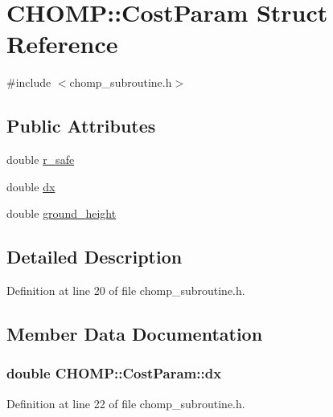 \hypertarget{struct_c_h_o_m_p_1_1_cost_param}{}\section{C\+H\+O\+MP\+:\+:Cost\+Param Struct Reference}
\label{struct_c_h_o_m_p_1_1_cost_param}


{\ttfamily \#include $<$chomp\+\_\+subroutine.\+h$>$}

\subsection*{Public Attributes}
\begin{DoxyCompactItemize}
\item 
double \hyperlink{struct_c_h_o_m_p_1_1_cost_param_a9ab5a375539e209151d57dea31b4eed9}{r\+\_\+safe}
\item 
double \hyperlink{struct_c_h_o_m_p_1_1_cost_param_aac37a7ec506745fea119ff57a711b0b6}{dx}
\item 
double \hyperlink{struct_c_h_o_m_p_1_1_cost_param_afdb481a80ee8ef47dc837075993f0821}{ground\+\_\+height}
\end{DoxyCompactItemize}


\subsection{Detailed Description}


Definition at line 20 of file chomp\+\_\+subroutine.\+h.



\subsection{Member Data Documentation}
\subsubsection[{\texorpdfstring{dx}{dx}}]{\setlength{\rightskip}{0pt plus 5cm}double C\+H\+O\+M\+P\+::\+Cost\+Param\+::dx}\hypertarget{struct_c_h_o_m_p_1_1_cost_param_aac37a7ec506745fea119ff57a711b0b6}{}\label{struct_c_h_o_m_p_1_1_cost_param_aac37a7ec506745fea119ff57a711b0b6}


Definition at line 22 of file chomp\+\_\+subroutine.\+h.

